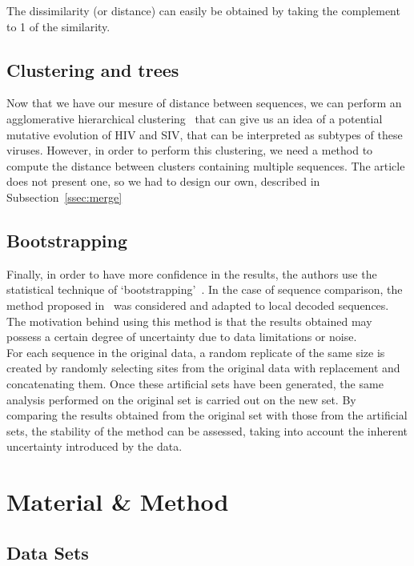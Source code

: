 \documentclass[english,13pt,a4paper]{article}
\theoremstyle{definition}
\theoremstyle{remark}
\theoremstyle{defstyle}
\begin{document}
The dissimilarity (or distance) can easily be obtained by taking the complement to 1 of the similarity.

\subsection{Clustering and trees}

Now that we have our mesure of distance between sequences, we can perform an agglomerative hierarchical clustering~\cite{anderberg1973cluster} that can give us an idea of a potential mutative evolution of HIV and SIV, that can be interpreted as subtypes of these viruses. However, in order to perform this clustering, we need a method to compute the distance between clusters containing multiple sequences. The article does not present one, so we had to design our own, described in Subsection~\ref{ssec:merge} 


\subsection{Bootstrapping}

Finally, in order to have more confidence in the results, the authors use the statistical technique of `bootstrapping'~\cite{efron1979bootstrap}. In the case of sequence comparison, the method proposed in~\cite{felsenstein1980confidence} was considered and adapted to local decoded sequences. The motivation behind using this method is that the results obtained may possess a certain degree of uncertainty due to data limitations or noise.\\

For each sequence in the original data, a random replicate of the same size is created by randomly selecting sites from the original data with replacement and concatenating them. Once these artificial sets have been generated, the same analysis performed on the original set is carried out on the new set. By comparing the results obtained from the original set with those from the artificial sets, the stability of the method can be assessed, taking into account the inherent uncertainty introduced by the data.

\section{Material \& Method}\label{sec:mat_method}

\subsection{Data Sets}\label{ssec:DS}
\end{document}
